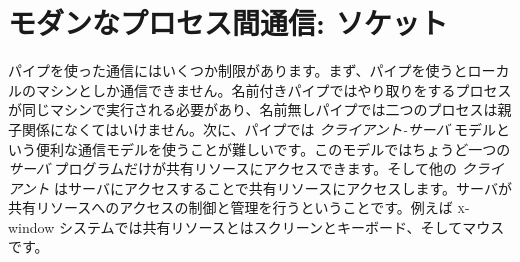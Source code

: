 %
%

\chapter{\label{sec/sockets}モダンなプロセス間通信: ソケット}

パイプを使った通信にはいくつか制限があります。まず、パイプを使うとローカルのマシンとしか通信できません。名前付きパイプではやり取りをするプロセスが同じマシンで実行される必要があり、名前無しパイプでは二つのプロセスは親子関係になくてはいけません。次に、パイプでは \emph{クライアント-サーバ} モデルという便利な通信モデルを使うことが難しいです。このモデルではちょうど一つの \emph{サーバ} プログラムだけが共有リソースにアクセスできます。そして他の \emph{クライアント} はサーバにアクセスすることで共有リソースにアクセスします。サーバが共有リソースへのアクセスの制御と管理を行うということです。例えば \textsc{x}-window システムでは共有リソースとはスクリーンとキーボード、そしてマウスです。

